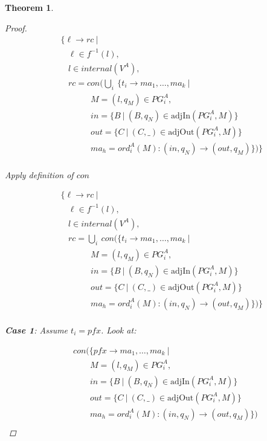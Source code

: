 \documentclass[twocolumn]{sig-alternate-10pt}
\newtheorem{thm}{Theorem}[section]
\begin{document}
\begin{thm}
\begin{proof}
  \[ \begin{array}{l}
     ~~~~~ \{ \ell \rightarrow rc ~\vert~ \\
     ~~~~~~~~~ \ell \in f^{-1}(l), \\
     ~~~~~~~~~ l \in internal(V^A), \\
     ~~~~~~~~~ rc = con(\bigcup_i~ \{ t_i \rightarrow ma_1, \dots, ma_k ~\vert~ \\
     ~~~~~~~~~~~~~~~~~~~~~ M = (l,q_M) \in PG^A_i, \\
     ~~~~~~~~~~~~~~~~~~~~~ in = \{ B ~\vert~ (B,q_N) \in \text{adjIn}(PG^A_i,M) \} \\
     ~~~~~~~~~~~~~~~~~~~~~ out = \{ C ~\vert~ (C,\_) \in \text{adjOut}(PG^A_i,M) \} \\
     ~~~~~~~~~~~~~~~~~~~~~ ma_h = ord^A_i(M) : (in,q_N) \rightarrow (out,q_M) \}) \} \\
  \end{array} \]%

  Apply definition of $con$

  \[ \begin{array}{l}
     ~~~~~ \{ \ell \rightarrow rc ~\vert~ \\
     ~~~~~~~~~ \ell \in f^{-1}(l), \\
     ~~~~~~~~~ l \in internal(V^A), \\
     ~~~~~~~~~ rc = \bigcup_i~ con(\{ t_i \rightarrow ma_1, \dots, ma_k ~\vert~ \\
     ~~~~~~~~~~~~~~~~~~~~~ M = (l,q_M) \in PG^A_i, \\
     ~~~~~~~~~~~~~~~~~~~~~ in = \{ B ~\vert~ (B,q_N) \in \text{adjIn}(PG^A_i,M) \} \\
     ~~~~~~~~~~~~~~~~~~~~~ out = \{ C ~\vert~ (C,\_) \in \text{adjOut}(PG^A_i,M) \} \\
     ~~~~~~~~~~~~~~~~~~~~~ ma_h = ord^A_i(M) : (in,q_N) \rightarrow (out,q_M) \}) \} \\
  \end{array} \]%

  \vspace{1em}
  \textbf{Case 1}: Assume $t_i = pfx$. Look at:

  \[ \begin{array}{l}
     ~~~~~~~~~ con(\{ pfx \rightarrow ma_1, \dots, ma_k ~\vert~ \\
     ~~~~~~~~~~~~~~~~~~ M = (l,q_M) \in PG^A_i, \\
     ~~~~~~~~~~~~~~~~~~ in = \{ B ~\vert~ (B,q_N) \in \text{adjIn}(PG^A_i,M) \} \\
     ~~~~~~~~~~~~~~~~~~ out = \{ C ~\vert~ (C,\_) \in \text{adjOut}(PG^A_i,M) \} \\
     ~~~~~~~~~~~~~~~~~~ ma_h = ord^A_i(M) : (in,q_N) \rightarrow (out,q_M) \}) \\
  \end{array} \]%


\end{proof}
\end{thm}
\end{document}
